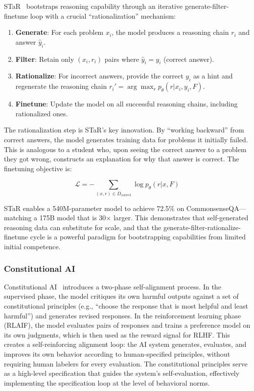 \documentclass[11pt,a4paper]{article}
\begin{document}
STaR~\citep{zelikman2022star} bootstraps reasoning capability through an iterative generate-filter-finetune loop with a crucial ``rationalization'' mechanism:

\begin{enumerate}
\item \textbf{Generate}: For each problem $x_i$, the model produces a reasoning chain $r_i$ and answer $\hat{y}_i$.
\item \textbf{Filter}: Retain only $(x_i, r_i)$ pairs where $\hat{y}_i = y_i$ (correct answer).
\item \textbf{Rationalize}: For incorrect answers, provide the correct $y_i$ as a hint and regenerate the reasoning chain $r_i' = \arg\max_r p_\theta(r | x_i, y_i, F)$.
\item \textbf{Finetune}: Update the model on all successful reasoning chains, including rationalized ones.
\end{enumerate}

The rationalization step is STaR's key innovation. By ``working backward'' from correct answers, the model generates training data for problems it initially failed. This is analogous to a student who, upon seeing the correct answer to a problem they got wrong, constructs an explanation for why that answer is correct. The finetuning objective is:

\begin{equation}
\mathcal{L} = -\sum_{(x,r) \in D_{\text{correct}}} \log p_\theta(r | x, F)
\end{equation}

\noindent STaR enables a 540M-parameter model to achieve 72.5\% on CommonsenseQA---matching a 175B model that is 30$\times$ larger. This demonstrates that self-generated reasoning data can substitute for scale, and that the generate-filter-rationalize-finetune cycle is a powerful paradigm for bootstrapping capabilities from limited initial competence.

\subsubsection{Constitutional AI}

Constitutional AI~\citep{bai2022constitutional} introduces a two-phase self-alignment process. In the supervised phase, the model critiques its own harmful outputs against a set of constitutional principles (e.g., ``choose the response that is most helpful and least harmful'') and generates revised responses. In the reinforcement learning phase (RLAIF), the model evaluates pairs of responses and trains a preference model on its own judgments, which is then used as the reward signal for RLHF. This creates a self-reinforcing alignment loop: the AI system generates, evaluates, and improves its own behavior according to human-specified principles, without requiring human labelers for every evaluation. The constitutional principles serve as a high-level specification that guides the system's self-evaluation, effectively implementing the specification loop at the level of behavioral norms.
\end{document}
